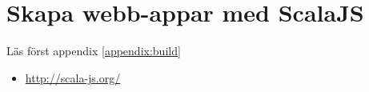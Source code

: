 
\chapter{Skapa webb-appar med ScalaJS}\label{appendix:scalajs}

\TODO

\noindent Läs först appendix \ref{appendix:build}

\begin{itemize}
\item \url{http://scala-js.org/}
\end{itemize}
